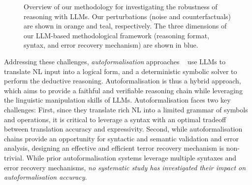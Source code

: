 \begin{figure}[!t]
    \caption{Overview of our methodology for investigating the robustness of reasoning with \acp{LLM}. Our perturbations (noise and counterfactuals) are shown in orange and teal, respectively. The three dimensions of our \ac{LLM}-based methodological framework (reasoning format, syntax, and error recovery mechanism) are shown in blue.}
    \label{fig:overview}
\end{figure}

Addressing these challenges, \emph{autoformalisation} approaches ~\cite{liangming_pan_logiclm_2023,olausson_linc_2023} use \acp{LLM} to translate \ac{NL} input into a logical form, and a deterministic symbolic solver to perform the deductive reasoning. Autoformalisation is thus a hybrid approach, which aims to provide a faithful and verifiable reasoning chain while leveraging the linguistic manipulation skills of \acp{LLM}. 
Autoformalisation faces two key challenges: First, since they translate rich \ac{NL} into a limited grammar of symbols and operations, it is critical to leverage a syntax with an optimal tradeoff between translation accuracy and expressivity. Second, while autoformalisation chains provide an opportunity for syntactic and semantic validation and error analysis, designing an effective and efficient terror recovery mechanism is non-trivial. While prior autoformalisation systems leverage multiple syntaxes and error recovery mechanisms, \textit{no systematic study has investigated their impact on autoformalisation accuracy}.

